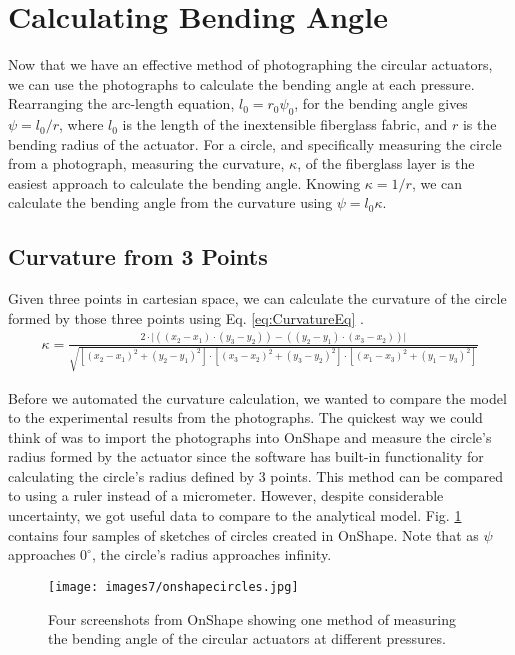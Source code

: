 \section{Calculating Bending Angle}

Now that we have an effective method of photographing the circular actuators, we can use the photographs to calculate the bending angle at each pressure. Rearranging the arc-length equation, $l_{0} = r_{0}\psi_{0}$, for the bending angle gives $\psi = l_0/r$, where $l_0$ is the length of the inextensible fiberglass fabric, and $r$ is the bending radius of the actuator. For a circle, and specifically measuring the circle from a photograph, measuring the curvature, $\kappa$, of the fiberglass layer is the easiest approach to calculate the bending angle. Knowing $\kappa = 1/r$, we can calculate the bending angle from the curvature using $\psi = l_{0}\kappa$. 

\subsection{Curvature from 3 Points}

Given three points in cartesian space, we can calculate the curvature of the circle formed by those three points using Eq. \ref{eq:CurvatureEq} \cite{ratliff_cartesian_2019}. 
\begin{align} 
    \kappa = \frac{2\cdot\lvert((x_2-x_1)\cdot(y_3-y_2)) - ((y_2-y_1)\cdot(x_3-x_2))\rvert}{\sqrt{[(x_2-x_1)^2+(y_2-y_1)^2] \cdot [(x_3-x_2)^2+(y_3-y_2)^2] \cdot [(x_1-x_3)^2+(y_1-y_3)^2]}} 
    \label{eq:CurvatureEq} 
\end{align}

Before we automated the curvature calculation, we wanted to compare the model to the experimental results from the photographs. The quickest way we could think of was to import the photographs into OnShape and measure the circle's radius formed by the actuator since the software has built-in functionality for calculating the circle's radius defined by 3 points. This method can be compared to using a ruler instead of a micrometer. However, despite considerable uncertainty, we got useful data to compare to the analytical model. Fig. \ref{fig:onshapecircles} contains four samples of sketches of circles created in OnShape. Note that as $\psi$ approaches $0^\circ$, the circle's radius approaches infinity. 

\begin{figure}[ht]
    \centering
     \texttt{[image: images7/onshapecircles.jpg]}
    \caption{Four screenshots from OnShape showing one method of measuring the bending angle of the circular actuators at different pressures.}
    \label{fig:onshapecircles}
\end{figure}

